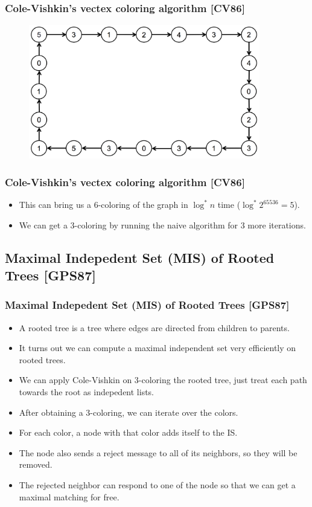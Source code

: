 \begin{frame}
\frametitle{Cole-Vishkin's vectex coloring algorithm [CV86]}
\begin{figure}
    \includegraphics[width=0.9\textwidth]{figures/cole-vishkin-3.png}
\end{figure}
\end{frame}

\begin{frame}
\frametitle{Cole-Vishkin's vectex coloring algorithm [CV86]}
\begin{itemize}
    \item This can bring us a 6-coloring of the graph in $\log^* n$ time ($\log^* 2^{65536} = 5$).
    \item We can get a 3-coloring by running the naive algorithm for 3 more iterations.
\end{itemize}
\end{frame}

\subsection{Maximal Indepedent Set (MIS) of Rooted Trees [GPS87]}
\begin{frame}
\frametitle{Maximal Indepedent Set (MIS) of Rooted Trees [GPS87]}
\begin{itemize}
    \item A rooted tree is a tree where edges are directed from children to parents.
    \item It turns out we can compute a maximal independent set very efficiently on rooted trees.
    \item We can apply Cole-Vishkin on 3-coloring the rooted tree, just treat each path towards the root as indepedent lists.
    \item After obtaining a 3-coloring, we can iterate over the colors.
    \item For each color, a node with that color adds itself to the IS.
    \item The node also sends a reject message to all of its neighbors, so they will be removed.
    \item The rejected neighbor can respond to one of the node so that we can get a maximal matching for free.
\end{itemize}
\end{frame}

